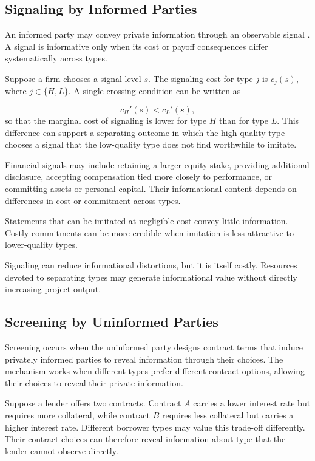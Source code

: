 \subsection{Signaling by Informed Parties}

An informed party may convey private information through an observable signal \cite{Spence1973}. A signal is informative only when its cost or payoff consequences differ systematically across types.

Suppose a firm chooses a signal level $s$. The signaling cost for type $j$ is $c_j(s)$, where $j\in\{H,L\}$. A single-crossing condition can be written as

\begin{equation}
c_H'(s)<c_L'(s),
\label{eq:ch3-single-crossing}
\end{equation}
so that the marginal cost of signaling is lower for type $H$ than for type $L$. This difference can support a separating outcome in which the high-quality type chooses a signal that the low-quality type does not find worthwhile to imitate.

Financial signals may include retaining a larger equity stake, providing additional disclosure, accepting compensation tied more closely to performance, or committing assets or personal capital. Their informational content depends on differences in cost or commitment across types.

Statements that can be imitated at negligible cost convey little information. Costly commitments can be more credible when imitation is less attractive to lower-quality types.

Signaling can reduce informational distortions, but it is itself costly. Resources devoted to separating types may generate informational value without directly increasing project output.

\subsection{Screening by Uninformed Parties}

Screening occurs when the uninformed party designs contract terms that induce privately informed parties to reveal information through their choices. The mechanism works when different types prefer different contract options, allowing their choices to reveal their private information.

Suppose a lender offers two contracts. Contract $A$ carries a lower interest rate but requires more collateral, while contract $B$ requires less collateral but carries a higher interest rate. Different borrower types may value this trade-off differently. Their contract choices can therefore reveal information about type that the lender cannot observe directly.

